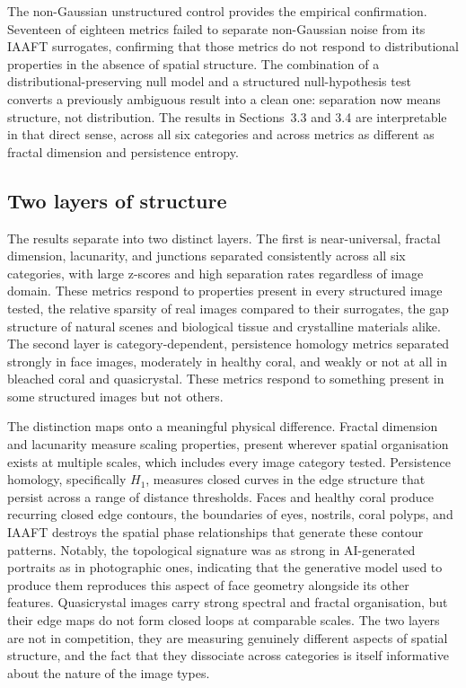 \documentclass[a4paper,12pt]{article}
\begin{document}
The non-Gaussian unstructured control provides the empirical confirmation. Seventeen of eighteen metrics failed to separate non-Gaussian noise from its IAAFT surrogates, confirming that those metrics do not respond to distributional properties in the absence of spatial structure. The combination of a distributional-preserving null model and a structured null-hypothesis test converts a previously ambiguous result into a clean one: separation now means structure, not distribution. The results in Sections~3.3 and 3.4 are interpretable in that direct sense, across all six categories and across metrics as different as fractal dimension and persistence entropy.

\subsection{Two layers of structure}

The results separate into two distinct layers. The first is near-universal, fractal dimension, lacunarity, and junctions separated consistently across all six categories, with large z-scores and high separation rates regardless of image domain. These metrics respond to properties present in every structured image tested, the relative sparsity of real images compared to their surrogates, the gap structure of natural scenes and biological tissue and crystalline materials alike. The second layer is category-dependent, persistence homology metrics separated strongly in face images, moderately in healthy coral, and weakly or not at all in bleached coral and quasicrystal. These metrics respond to something present in some structured images but not others.

The distinction maps onto a meaningful physical difference. Fractal dimension and lacunarity measure scaling properties, present wherever spatial organisation exists at multiple scales, which includes every image category tested. Persistence homology, specifically $H_1$, measures closed curves in the edge structure that persist across a range of distance thresholds. Faces and healthy coral produce recurring closed edge contours, the boundaries of eyes, nostrils, coral polyps, and IAAFT destroys the spatial phase relationships that generate these contour patterns. Notably, the topological signature was as strong in AI-generated portraits as in photographic ones, indicating that the generative model used to produce them reproduces this aspect of face geometry alongside its other features. Quasicrystal images carry strong spectral and fractal organisation, but their edge maps do not form closed loops at comparable scales. The two layers are not in competition, they are measuring genuinely different aspects of spatial structure, and the fact that they dissociate across categories is itself informative about the nature of the image types.
\end{document}
